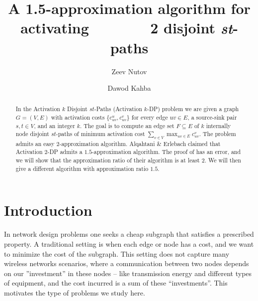 \documentclass[a4paper,UKenglish,autoref]{lipics-v2019}
\title{A 1.5-approximation algorithm for activating \ \ \ \ \ \ \ 2 disjoint {\em st}-paths}
\author{Zeev Nutov}{The Open University of Israel}{nutov@openu.ac.il}
{https://orcid.org/0000-0002-6629-3243}{}
\author{Dawod Kahba}{The Open University of Israel}{kabhad82@gmail.com}{}{}
\begin{document}
\maketitle
\newcommand {\ignore} [1] {}

\newcommand{\sem}    {\setminus}
\newcommand{\subs}   {\subseteq}
\newcommand{\empt}   {\emptyset}

\newcommand{\f}   {\frac}

\def\al   {\alpha}
\def\be  {\beta}

\def\FF {{\cal F}}
\def\II    {{\cal I}}

\def\atdpa   {{\sc Activation $2$-DP Augmentation}}



\begin{abstract}
In the {\sc Activation $k$ Disjoint $st$-Paths} ({\sc Activation $k$-DP}) problem  we are given a graph $G=(V,E)$ 
with activation costs $\{c_{uv}^u,c_{uv}^v\}$ for every edge $uv \in E$, a source-sink pair $s,t \in V$, and an integer $k$. 
The goal is to compute an edge set $F \subs E$  of $k$ internally node disjoint $st$-paths of minimum activation cost
$\displaystyle \sum_{v \in V}\max_{uv \in E}c_{uv}^v$.
The problem admits an easy $2$-approximation algorithm. 
Alqahtani \& Erlebach \cite{AE} claimed that {\sc Activation $2$-DP} admits a $1.5$-approximation algorithm.
The proof of \cite{AE} has an error, and we will show that the approximation ratio of their algorithm is at least $2$.
We will then give a different algorithm with approximation ratio $1.5$. 
\end{abstract}

\section{Introduction} \label{s:intro}

In network design problems one seeks a cheap subgraph that satisfies a prescribed property.
A traditional setting is when each edge or node has a cost, and we want to minimize the cost of the subgraph.  
This setting does not capture many wireless networks scenarios, where a communication between two nodes 
depends on our ''investment'' in these nodes -- like transmission energy and different types of equipment,
and the cost incurred is a sum of these ``investments''.
This motivates the type of problems we study here.
\end{document}
